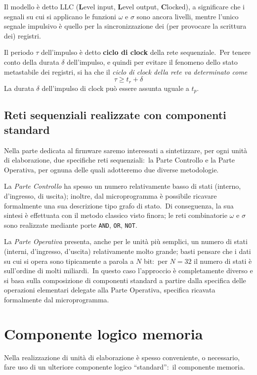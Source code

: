 Il modello è detto LLC (\textbf{L}evel input, \textbf{L}evel output, \textbf{C}locked), a significare che i segnali su cui si applicano le funzioni $\omega$ e $\sigma$ sono ancora livelli, mentre l'unico segnale impulsivo è quello per la sincronizzazione dei (per provocare la scrittura dei) registri.

Il periodo $\tau$ dell'impulso è detto \textbf{ciclo di clock} della rete sequenziale.\
Per tenere conto della durata $\delta$ dell'impulso, e quindi per evitare il fenomeno dello stato metastabile dei registri, si ha che il \textit{ciclo di clock della rete va determinato come}
\[\tau \geq t_r+\delta\]
La durata $\delta$ dell'impulso di clock può essere assunta uguale a $t_p$.

\subsection{Reti sequenziali realizzate con componenti standard}

Nella parte dedicata al firmware saremo interessati a sintetizzare, per ogni unità di elaborazione, due specifiche reti sequenziali:\ la Parte Controllo e la Parte Operativa, per ognuna delle quali adotteremo due diverse metodologie.

La \textit{Parte Controllo} ha spesso un numero relativamente basso di stati (interno, d'ingresso, di uscita); inoltre, dal microprogramma è possibile ricavare formalmente una sua descrizione tipo grafo di stato.\
Di conseguenza, la sua sintesi è effettuata con il metodo classico visto finora; le reti combinatorie $\omega$ e $\sigma$ sono realizzate mediante porte \texttt{AND}, \texttt{OR}, \texttt{NOT}.

La \textit{Parte Operativa} presenta, anche per le unità più semplici, un numero di stati (interni, d'ingresso, d'uscita) relativamente molto grande; basti pensare che i dati su cui si opera sono tipicamente a parola a $N$ bit:\ per $N=32$ il numero di stati è sull'ordine di molti miliardi.\
In questo caso l'approccio è completamente diverso e si basa sulla composizione di componenti standard a partire dalla specifica delle operazioni elementari delegate alla Parte Operativa, specifica ricavata formalmente dal microprogramma.

\section{Componente logico memoria}

Nella realizzazione di unità di elaborazione è spesso conveniente, o necessario, fare uso di un ulteriore componente logico ``standard'':\ il componente memoria.

